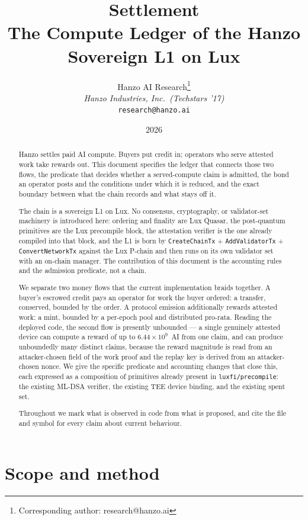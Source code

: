 \documentclass[11pt,a4paper]{article}
\title{Settlement\\[6pt]
\large The Compute Ledger of the Hanzo Sovereign L1 on Lux}
\author{
Hanzo AI Research\thanks{Corresponding author: research@hanzo.ai}\\
\textit{Hanzo Industries, Inc.\ (Techstars '17)}\\
\texttt{research@hanzo.ai}
}
\date{2026}
\theoremstyle{definition}
\theoremstyle{remark}
\newcommand{\code}[1]{\texttt{#1}}
\begin{document}
\hanzocoverpage

\begin{abstract}
Hanzo settles paid AI compute. Buyers put credit in; operators who serve
attested work take rewards out. This document specifies the ledger that
connects those two flows, the predicate that decides whether a served-compute
claim is admitted, the bond an operator posts and the conditions under which it
is reduced, and the exact boundary between what the chain records and what stays
off it.

The chain is a sovereign L1 on Lux. No consensus, cryptography, or
validator-set machinery is introduced here: ordering and finality are Lux
Quasar, the post-quantum primitives are the Lux precompile block, the
attestation verifier is the one already compiled into that block, and the L1 is
born by \code{CreateChainTx} + \code{AddValidatorTx} + \code{ConvertNetworkTx}
against the Lux P-chain and then runs on its own validator set with an on-chain
manager. The contribution of this document is the accounting rules and the
admission predicate, not a chain.

We separate two money flows that the current implementation braids together. A
buyer's escrowed credit pays an operator for work the buyer ordered: a transfer,
conserved, bounded by the order. A protocol emission additionally rewards
attested work: a mint, bounded by a per-epoch pool and distributed pro-rata.
Reading the deployed code, the second flow is presently unbounded --- a single
genuinely attested device can compute a reward of up to $6.44 \times 10^{9}$~AI
from one claim, and can produce unboundedly many distinct claims, because the
reward magnitude is read from an attacker-chosen field of the work proof and the
replay key is derived from an attacker-chosen nonce. We give the specific
predicate and accounting changes that close this, each expressed as a
composition of primitives already present in \code{luxfi/precompile}: the
existing ML-DSA verifier, the existing TEE device binding, and the existing
spent set.

Throughout we mark what is observed in code from what is proposed, and cite the
file and symbol for every claim about current behaviour.
\end{abstract}

\tableofcontents
\newpage

\section{Scope and method}
\end{document}
